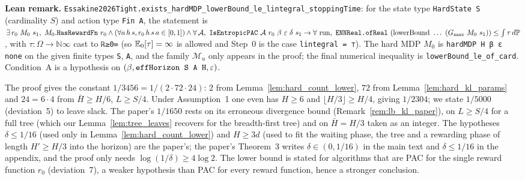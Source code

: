 \textbf{Lean remark.} \texttt{Essakine2026Tight.exists\_hardMDP\_lowerBound\_le\_lintegral\_stoppingTime}:
for the state type \texttt{HardState S} (cardinality $S$) and action type \texttt{Fin A}, the
statement is
$\exists\, r_0\ M_0\ s_1,\ M_0.\texttt{HasRewardFn}\ r_0 \wedge (\forall a\, h\, s, r_0\, h\, s\, a \in [0,1]) \wedge
\forall\, \mathcal A,\ \texttt{IsEntropicPAC}\ \mathcal A\ r_0\ \beta\ \eps\ \delta\ s_1 \to \forall \text{ run},\
\texttt{ENNReal.ofReal}\ (\mathrm{lowerBound}\ \dots\ (\Gmax\ M_0\ s_1)) \le \int \tau\, d\Prob$,
with $\tau : \Omega \to \texttt{ℕ∞}$ cast to \texttt{ℝ≥0∞} (so $\mathbb{E}_0[\tau] = \infty$ is allowed and
Step~0 is the case \texttt{lintegral = ⊤}). The hard MDP $M_0$ is \texttt{hardMDP H β ε none} on the
given finite types \texttt{S}, \texttt{A}, and the family $\mathcal M_u$ only appears in the proof; the final
numerical inequality is \texttt{lowerBound\_le\_of\_card}. Condition~A is a hypothesis on
$(\beta, \texttt{effHorizon S A H}, \varepsilon)$.

\begin{remark}\label{rem:lb_constant}
The proof gives the constant $1/3456 = 1/(2\cdot 72\cdot 24)$: $2$ from
Lemma~\ref{lem:hard_count_lower}, $72$ from Lemma~\ref{lem:hard_kl_params} and $24 = 6\cdot 4$
from $\bar H \ge H/6$, $L \ge S/4$. Under Assumption~1 one even has $H \ge 6$ and
$\lfloor H/3\rfloor \ge H/4$, giving $1/2304$; we state $1/5000$ (deviation~5) to leave slack.
The paper's $1/1650$ rests on its erroneous divergence bound (Remark~\ref{rem:lb_kl_paper}),
on $L \ge S/4$ for a full tree (which our Lemma~\ref{lem:tree_leaves} recovers for the
breadth-first tree) and on $\bar H = H/3$ taken as an integer. The hypotheses $\delta \le 1/16$
(used only in Lemma~\ref{lem:hard_count_lower}) and $H \ge 3d$ (used to fit the waiting phase,
the tree and a rewarding phase of length $H' \ge H/3$ into the horizon) are the paper's; the
paper's Theorem~3 writes $\delta \in (0, 1/16)$ in the main text and $\delta \le 1/16$ in the
appendix, and the proof only needs $\log(1/\delta) \ge 4\log 2$. The lower bound is stated for
algorithms that are PAC for the single reward function $r_0$ (deviation~7), a weaker hypothesis
than PAC for every reward function, hence a stronger conclusion.
\end{remark}
